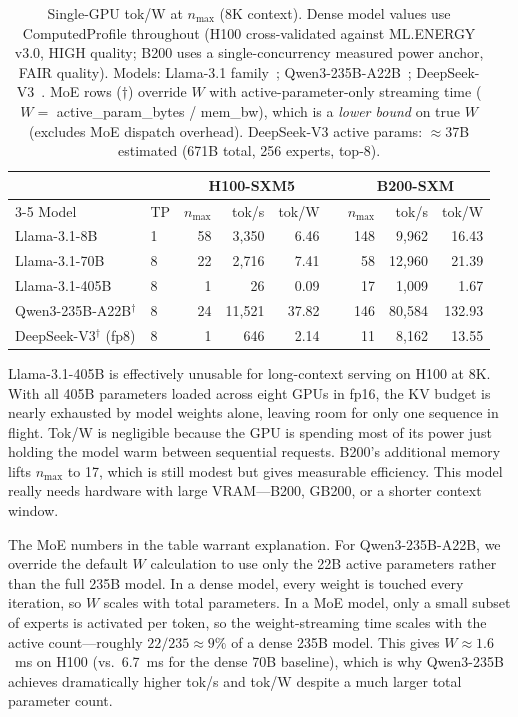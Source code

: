 \documentclass[11pt,a4paper]{article}
\newcommand{\nmax}{n_{\max}}
\begin{document}
\begin{table}[htbp]
\centering
\caption{Single-GPU tok/W at $\nmax$ (8K context).  Dense model values
  use ComputedProfile throughout (H100 cross-validated against ML.ENERGY
  v3.0, HIGH quality; B200 uses a single-concurrency measured power anchor,
  FAIR quality).
  Models: Llama-3.1 family~\citep{meta2024llama3};
  Qwen3-235B-A22B~\citep{qwen2025qwen3};
  DeepSeek-V3~\citep{deepseekai2025v3}.
  MoE rows ($\dagger$) override $W$ with active-parameter-only streaming
  time ($W = $ active\_param\_bytes / mem\_bw), which is a \emph{lower
  bound} on true $W$ (excludes MoE dispatch overhead).
  DeepSeek-V3 active params: $\approx$37B estimated (671B total,
  256 experts, top-8).}
\label{tab:arch-tpw}
\small
\begin{tabular}{llrrrrrrr}
\toprule
& & \multicolumn{3}{c}{H100-SXM5} & \phantom{a} &
  \multicolumn{3}{c}{B200-SXM} \\
\cmidrule{3-5} \cmidrule{7-9}
Model & TP & $\nmax$ & tok/s & tok/W & & $\nmax$ & tok/s & tok/W \\
\midrule
Llama-3.1-8B         & 1 &  58 & 3{,}350 &  6.46 &&  148 &  9{,}962 & 16.43 \\
Llama-3.1-70B        & 8 &  22 & 2{,}716 &  7.41 &&   58 & 12{,}960 & 21.39 \\
Llama-3.1-405B       & 8 &   1 &      26 &  0.09 &&   17 &  1{,}009 &  1.67 \\
Qwen3-235B-A22B$^\dagger$ & 8 & 24 & 11{,}521 & 37.82 && 146 & 80{,}584 & 132.93 \\
DeepSeek-V3$^\dagger$ (fp8) & 8 & 1 & 646 & 2.14 &&   11 &  8{,}162 & 13.55 \\
\bottomrule
\end{tabular}
\end{table}

Llama-3.1-405B is effectively unusable for long-context serving on H100 at
8K.  With all 405B parameters loaded across eight GPUs in fp16, the KV budget
is nearly exhausted by model weights alone, leaving room for only one sequence
in flight.  Tok/W is negligible because the GPU is spending most of its power
just holding the model warm between sequential requests.  B200's additional
memory lifts $\nmax$ to 17, which is still modest but gives measurable
efficiency.  This model really needs hardware with large VRAM---B200, GB200,
or a shorter context window.

The MoE numbers in the table warrant explanation.  For Qwen3-235B-A22B, we
override the default $W$ calculation to use only the 22B active parameters
rather than the full 235B model.  In a dense model, every weight is touched
every iteration, so $W$ scales with total parameters.  In a MoE model, only
a small subset of experts is activated per token, so the weight-streaming
time scales with the active count---roughly $22/235 \approx 9\%$ of a dense
235B model.  This gives $W \approx 1.6$~ms on H100 (vs.\ 6.7~ms for the
dense 70B baseline), which is why Qwen3-235B achieves dramatically higher
tok/s and tok/W despite a much larger total parameter count.
\end{document}

